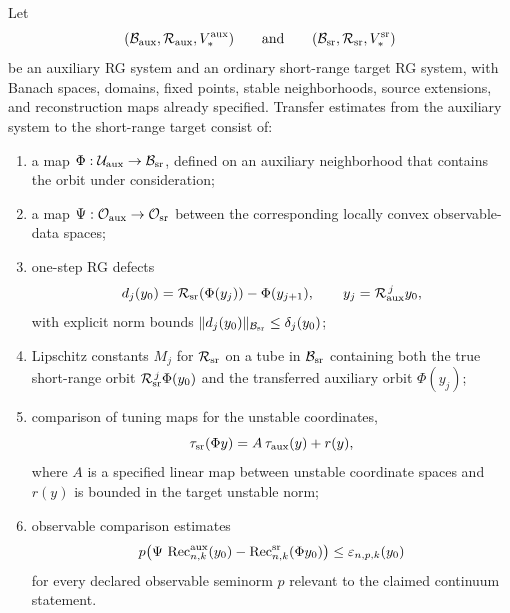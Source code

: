 \begin{definition}
\label{def:auxiliary-to-short-range-rg-transfer-estimates}
Let
\[
  (\mathcal B_{\rm aux},\mathcal R_{\rm aux},V_{\ast}^{\rm aux})
  \qquad\text{and}\qquad
  (\mathcal B_{\rm sr},\mathcal R_{\rm sr},V_{\ast}^{\rm sr})
\]
be an auxiliary RG system and an ordinary short-range target RG system, with
Banach spaces, domains, fixed points, stable neighborhoods, source
extensions, and reconstruction maps already specified.  Transfer estimates from
the auxiliary system to the short-range target consist of:
\begin{enumerate}
  \item a map
  \(\Phi:\mathcal U_{\rm aux}\to\mathcal B_{\rm sr}\), defined on an
  auxiliary neighborhood that contains the orbit under consideration;
  \item a map \(\Psi:\mathcal O_{\rm aux}\to\mathcal O_{\rm sr}\) between the
  corresponding locally convex observable-data spaces;
  \item one-step RG defects
  \begin{equation}
    d_j(y_0)
    =
    \mathcal R_{\rm sr}\!\left(\Phi(y_j)\right)
    -
    \Phi(y_{j+1}),
    \qquad
    y_j=\mathcal R_{\rm aux}^{\,j}y_0 ,
    \label{eq:auxiliary-short-range-one-step-defect}
  \end{equation}
  with explicit norm bounds
  \(\|d_j(y_0)\|_{\mathcal B_{\rm sr}}\leq\delta_j(y_0)\);
  \item Lipschitz constants \(M_j\) for \(\mathcal R_{\rm sr}\) on a tube in
  \(\mathcal B_{\rm sr}\) containing both the true short-range orbit
  \(\mathcal R_{\rm sr}^{\,j}\Phi(y_0)\) and the transferred auxiliary orbit
  \(\Phi(y_j)\);
  \item comparison of tuning maps for the unstable coordinates,
  \begin{equation}
    \tau_{\rm sr}(\Phi y)
    =
    A\,\tau_{\rm aux}(y)+r(y),
    \label{eq:auxiliary-short-range-tuning-map}
  \end{equation}
  where \(A\) is a specified linear map between unstable coordinate spaces and
  \(r(y)\) is bounded in the target unstable norm;
  \item observable comparison estimates
  \begin{equation}
    p\!\left(
      \Psi\,\operatorname{Rec}^{\rm aux}_{n,k}(y_0)
      -
      \operatorname{Rec}^{\rm sr}_{n,k}(\Phi y_0)
    \right)
    \leq
    \varepsilon_{n,p,k}(y_0)
    \label{eq:auxiliary-short-range-observable-defect}
  \end{equation}
  for every declared observable seminorm \(p\) relevant to the claimed
  continuum statement.
\end{enumerate}
\end{definition}

